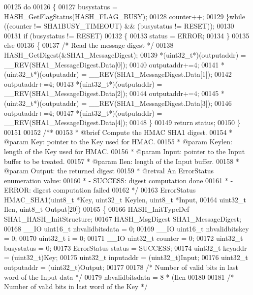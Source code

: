 \begin{DoxyCode}
00125   \textcolor{keywordflow}{do}
00126   \{
00127     busystatus = HASH\_GetFlagStatus(HASH_FLAG_BUSY);
00128     counter++;
00129   \}\textcolor{keywordflow}{while} ((counter != SHA1BUSY_TIMEOUT) && (busystatus != RESET));
00130 
00131   \textcolor{keywordflow}{if} (busystatus != RESET)
00132   \{
00133      status = ERROR;
00134   \}
00135   \textcolor{keywordflow}{else}
00136   \{
00137     \textcolor{comment}{/* Read the message digest */}
00138     HASH\_GetDigest(&SHA1\_MessageDigest);
00139     *(uint32\_t*)(outputaddr)  = \_\_REV(SHA1\_MessageDigest.Data[0]);
00140     outputaddr+=4;
00141     *(uint32\_t*)(outputaddr)  = \_\_REV(SHA1\_MessageDigest.Data[1]);
00142     outputaddr+=4;
00143     *(uint32\_t*)(outputaddr)  = \_\_REV(SHA1\_MessageDigest.Data[2]);
00144     outputaddr+=4;
00145     *(uint32\_t*)(outputaddr)  = \_\_REV(SHA1\_MessageDigest.Data[3]);
00146     outputaddr+=4;
00147     *(uint32\_t*)(outputaddr)  = \_\_REV(SHA1\_MessageDigest.Data[4]);
00148   \}
00149   \textcolor{keywordflow}{return} status;
00150 \}
00151 
00152 \textcolor{comment}{/**}
00153 \textcolor{comment}{  * @brief  Compute the HMAC SHA1 digest.}
00154 \textcolor{comment}{  * @param  Key: pointer to the Key used for HMAC.}
00155 \textcolor{comment}{  * @param  Keylen: length of the Key used for HMAC.  }
00156 \textcolor{comment}{  * @param  Input: pointer to the Input buffer to be treated.}
00157 \textcolor{comment}{  * @param  Ilen: length of the Input buffer.}
00158 \textcolor{comment}{  * @param  Output: the returned digest}
00159 \textcolor{comment}{  * @retval An ErrorStatus enumeration value:}
00160 \textcolor{comment}{  *          - SUCCESS: digest computation done}
00161 \textcolor{comment}{  *          - ERROR: digest computation failed}
00162 \textcolor{comment}{  */}
00163 ErrorStatus HMAC_SHA1(uint8\_t *Key, uint32\_t Keylen, uint8\_t *Input,
00164                       uint32\_t Ilen, uint8\_t Output[20])
00165 \{
00166   HASH\_InitTypeDef SHA1\_HASH\_InitStructure;
00167   HASH\_MsgDigest SHA1\_MessageDigest;
00168   \_\_IO uint16\_t nbvalidbitsdata = 0;
00169   \_\_IO uint16\_t nbvalidbitskey = 0;
00170   uint32\_t i = 0;
00171   \_\_IO uint32\_t counter = 0;
00172   uint32\_t busystatus = 0;
00173   ErrorStatus status = SUCCESS;
00174   uint32\_t keyaddr    = (uint32\_t)Key;
00175   uint32\_t inputaddr  = (uint32\_t)Input;
00176   uint32\_t outputaddr = (uint32\_t)Output;
00177 
00178   \textcolor{comment}{/* Number of valid bits in last word of the Input data */}
00179   nbvalidbitsdata = 8 * (Ilen %
00180 
00181   \textcolor{comment}{/* Number of valid bits in last word of the Key */}

\end{DoxyCode}
